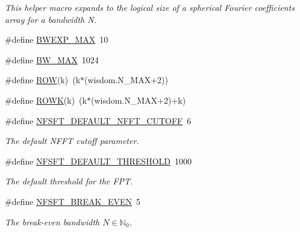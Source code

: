 \begin{CompactItemize}
\begin{CompactList}\small\item\em This helper macro expands to the logical size of a spherical Fourier coefficients array for a bandwidth N. \item\end{CompactList}\item 
\hypertarget{group__nfsft_g6ebc87b6a9996327fdf13c4c3b2f79c1}{
\#define \hyperlink{group__nfsft_g6ebc87b6a9996327fdf13c4c3b2f79c1}{BWEXP\_\-MAX}~10}
\label{group__nfsft_g6ebc87b6a9996327fdf13c4c3b2f79c1}

\item 
\hypertarget{group__nfsft_g7a05635f8b2f1099a6a57dafbb6a1cb1}{
\#define \hyperlink{group__nfsft_g7a05635f8b2f1099a6a57dafbb6a1cb1}{BW\_\-MAX}~1024}
\label{group__nfsft_g7a05635f8b2f1099a6a57dafbb6a1cb1}

\item 
\hypertarget{group__nfsft_g419a0077c38536976cf6ad9d7fddd9e5}{
\#define \hyperlink{group__nfsft_g419a0077c38536976cf6ad9d7fddd9e5}{ROW}(k)~(k$\ast$(wisdom.N\_\-MAX+2))}
\label{group__nfsft_g419a0077c38536976cf6ad9d7fddd9e5}

\item 
\hypertarget{group__nfsft_g5c75ea9f4835d9aa1b75dac53622e488}{
\#define \hyperlink{group__nfsft_g5c75ea9f4835d9aa1b75dac53622e488}{ROWK}(k)~(k$\ast$(wisdom.N\_\-MAX+2)+k)}
\label{group__nfsft_g5c75ea9f4835d9aa1b75dac53622e488}

\item 
\#define \hyperlink{group__nfsft_g206c4faaf800b49dcb14e26148fa9ac6}{NFSFT\_\-DEFAULT\_\-NFFT\_\-CUTOFF}~6
\begin{CompactList}\small\item\em The default NFFT cutoff parameter. \item\end{CompactList}\item 
\#define \hyperlink{group__nfsft_gb7d25b80464387893b3c773f92e5c4f3}{NFSFT\_\-DEFAULT\_\-THRESHOLD}~1000
\begin{CompactList}\small\item\em The default threshold for the FPT. \item\end{CompactList}\item 
\#define \hyperlink{group__nfsft_g54b840898df97bcd14af4cb004650ed3}{NFSFT\_\-BREAK\_\-EVEN}~5
\begin{CompactList}\small\item\em The break-even bandwidth $N \in \mathbb{N}_0$. \item\end{CompactList}\end{CompactItemize}
